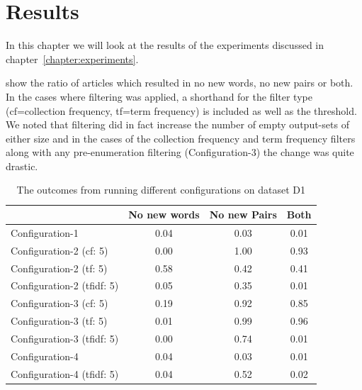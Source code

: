 \chapter{Results}
\label{chapter:results}
In this chapter we will look at the results of the experiments discussed in chapter~\ref{chapter:experiments}.

 show the ratio of articles which resulted in no new words, no new pairs or both. In the cases where filtering was applied, a shorthand for the filter type (cf=collection frequency, tf=term frequency) is included as well as the threshold. We noted that filtering did in fact increase the number of empty output-sets of either size and in the cases of the collection frequency and term frequency filters along with any pre-enumeration filtering (Configuration-3) the change was quite drastic.

\begin{center}
  \begin{table}[ht]
  \begin{tabular}{|l|c|c|c|}
    \hline
    &  No new words & No new Pairs & Both \\ \hline
    Configuration-1                    & 0.04  & 0.03  & 0.01 \\ \hline
    Configuration-2 (cf: 5)            & 0.00  & 1.00  & 0.93 \\ \hline
    Configuration-2 (tf: 5)            & 0.58  & 0.42  & 0.41 \\ \hline
    Configuration-2 (tfidf: 5)         & 0.05  & 0.35  & 0.01 \\ \hline
    Configuration-3 (cf: 5)            & 0.19  & 0.92  & 0.85 \\ \hline
    Configuration-3 (tf: 5)            & 0.01  & 0.99  & 0.96 \\ \hline
    Configuration-3 (tfidf: 5)         & 0.00  & 0.74  & 0.01 \\ \hline
    Configuration-4                    & 0.04  & 0.03  & 0.01 \\ \hline
    Configuration-4 (tfidf: 5)         & 0.04  & 0.52  & 0.02 \\ \hline
  \end{tabular}
  \caption{The outcomes from running different configurations on dataset D1}
  \label{tab:d1}
\end{table}
\end{center}

